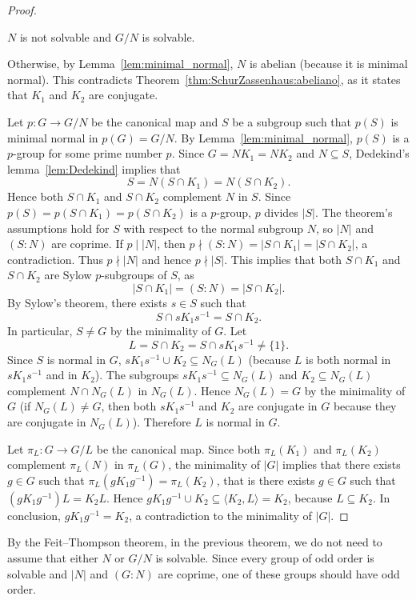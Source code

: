 \begin{proof}
	\begin{claim}
		$N$ is not solvable and $G/N$ is solvable. 
	\end{claim}
	
	Otherwise, by Lemma~\ref{lem:minimal_normal}, $N$ is abelian (because it is minimal normal). This contradicts
    Theorem~\ref{thm:SchurZassenhaus:abeliano}, as it states that 
	$K_1$ and $K_2$ are conjugate. 
 
	\medskip
	Let $p\colon G\to G/N$ be the canonical map and $S$ be a subgroup such that $p(S)$
	is minimal normal in $p(G)=G/N$.  By Lemma~\ref{lem:minimal_normal},
	$p(S)$ is a $p$-group for some prime number $p$. Since $G=NK_1=NK_2$ and $N\subseteq
	S$, Dedekind's lemma~\ref{lem:Dedekind} implies that 
	\[
	S=N(S\cap K_1)=N(S\cap K_2).
	\]
	Hence both $S\cap K_1$ and $S\cap K_2$
	complement $N$ in $S$. Since $p(S)=p(S\cap K_1)=p(S\cap K_2)$  is a $p$-group, 
 	$p$ divides $|S|$. The theorem's assumptions hold for $S$ with respect to the normal subgroup $N$, 
    so $|N|$ and $(S:N)$ are coprime. If $p\mid |N|$, then 
	$p\nmid (S:N)=|S\cap K_1|=|S\cap K_2|$, a contradiction. Thus $p\nmid |N|$ and 
	hence $p\nmid |S|$. This implies that both $S\cap K_1$ and $S\cap K_2$ are Sylow 
	$p$-subgroups of $S$, as 
	\[
		|S\cap K_1|=(S:N)=|S\cap K_2|.
	\]
	By Sylow's theorem, there exists $s\in
	S$ such that 
    \[
	S\cap sK_1s^{-1}=S\cap K_2.
	\]
	In particular, $S\ne G$ by the minimality of $G$.
	Let 
	\[
		L=S\cap K_2=S\cap sK_1s^{-1}\ne\{1\}.
	\]
	Since $S$ is normal in $G$, $sK_1s^{-1}\cup K_2\subseteq N_G(L)$ (because $L$
	is both normal in $sK_1s^{-1}$ and in $K_2$). The subgroups $sK_1s^{-1}\subseteq
	N_G(L)$ and $K_2\subseteq N_G(L)$ complement $N\cap N_G(L)$ in $N_G(L)$. Hence 
	$N_G(L)=G$ by the minimality of $G$ (if $N_G(L)\ne G$, then both 
	$sK_1s^{-1}$ and $K_2$ are conjugate in $G$ because they are conjugate in  $N_G(L)$). Therefore 
	$L$ is normal in $G$. 
	
	Let $\pi_L\colon G\to G/L$ be the canonical map. Since both 
	$\pi_L(K_1)$ and $\pi_L(K_2)$ complement $\pi_L(N)$ in $\pi_L(G)$, the minimality of 
	$|G|$ implies that there exists $g\in G$ such that $\pi_L(gK_1g^{-1})=\pi_L(K_2)$, that is 
	there exists $g\in G$ such that $(gK_1g^{-1})L=K_2L$.  Hence $gK_1g^{-1}\cup
	K_2\subseteq \langle K_2,L\rangle=K_2$, because $L\subseteq K_2$. In conclusion, 
	$gK_1g^{-1}=K_2$, a contradiction to the minimality of $|G|$. 
%
\end{proof}


By the Feit--Thompson theorem, in the previous theorem, 
we do not need to assume that either $N$ or $G/N$ is solvable. Since every group of odd order is solvable 
and $|N|$ and $(G:N)$ are coprime, one of these groups should have odd order. 

